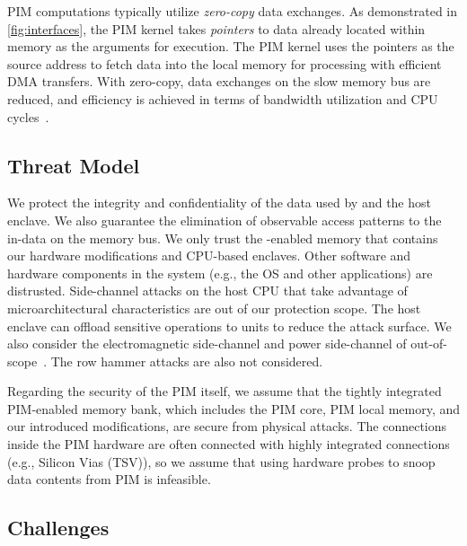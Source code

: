  PIM computations typically utilize \emph{zero-copy} data exchanges. As demonstrated in \autoref{fig:interfaces}, the PIM kernel takes \emph{pointers} to data already located within memory as the arguments for execution. The PIM kernel uses the pointers as the source address to fetch data into the local memory for processing with efficient DMA transfers. With zero-copy, data exchanges on the slow memory bus are reduced, and efficiency is achieved in terms of bandwidth utilization and CPU cycles~\cite{pointer-chasing,smcsim,primer-on-pim}.


\subsection{Threat Model}
\label{subsec:threat-model}
We protect the integrity and confidentiality of the data used by \thename and the host enclave. We also guarantee the elimination of observable access patterns to the in-\thename data on the memory bus. We only trust the \thename-enabled memory that contains our hardware modifications and CPU-based enclaves. Other software and hardware components in the system (e.g., the OS and other applications) are distrusted. Side-channel attacks on the host CPU that take advantage of microarchitectural characteristics are out of our protection scope. The host enclave can offload sensitive operations to \thename units to reduce the attack surface. We also consider the electromagnetic side-channel and power side-channel of \thename out-of-scope~\cite{power-side-channel-accelerator}. The row hammer attacks are also not considered.

Regarding the security of the PIM itself, we assume that the tightly integrated PIM-enabled memory bank, which includes the PIM core, PIM local memory, and our introduced modifications, are secure from physical attacks. The connections inside the PIM hardware are often connected with highly integrated connections (e.g., Silicon Vias (TSV)), so we assume that using hardware probes to snoop data contents from PIM is infeasible.




\subsection{Challenges}
\label{subsec:limitations}
\label{subsec:attack-vectors}
\label{subsec:challenges}


